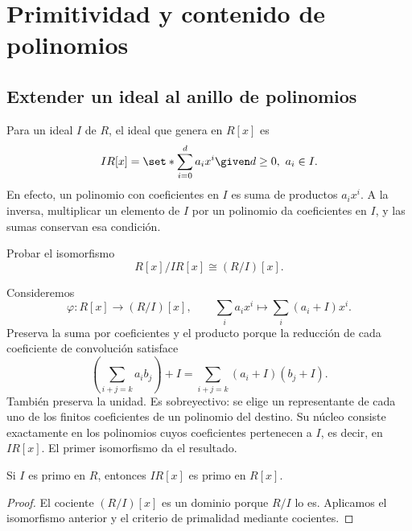 \section{Primitividad y contenido de polinomios}
\subsection{Extender un ideal al anillo de polinomios}
Para un ideal $I$ de $R$, el ideal que genera en $R[x]$ es
\[
IR[x]=\set*{\sum_{i=0}^d a_ix^i\given d\geq0,\ a_i\in I}.
\]
En efecto, un polinomio con coeficientes en $I$ es suma de productos $a_ix^i$. A la inversa, multiplicar un elemento de $I$ por un polinomio da coeficientes en $I$, y las sumas conservan esa condición.

\begin{ejer}\label{ejer:C17-coeficientes}
Probar el isomorfismo
\[
R[x]/IR[x]\cong(R/I)[x].
\]

\end{ejer}
\begin{sol}
Consideremos
\[
\varphi:R[x]\longrightarrow(R/I)[x],\qquad
\sum_i a_ix^i\longmapsto\sum_i(a_i+I)x^i.
\]
Preserva la suma por coeficientes y el producto porque la reducción de cada coeficiente de convolución satisface
\[
\left(\sum_{i+j=k}a_ib_j\right)+I
=\sum_{i+j=k}(a_i+I)(b_j+I).
\]
También preserva la unidad. Es sobreyectivo: se elige un representante de cada uno de los finitos coeficientes de un polinomio del destino. Su núcleo consiste exactamente en los polinomios cuyos coeficientes pertenecen a $I$, es decir, en $IR[x]$. El primer isomorfismo da el resultado.
\end{sol}
\begin{coro}\label{coro:C17-primo-extendido}
Si $I$ es primo en $R$, entonces $IR[x]$ es primo en $R[x]$.
\end{coro}
\begin{proof}
El cociente $(R/I)[x]$ es un dominio porque $R/I$ lo es. Aplicamos el isomorfismo anterior y el criterio de primalidad mediante cocientes.
\end{proof}

